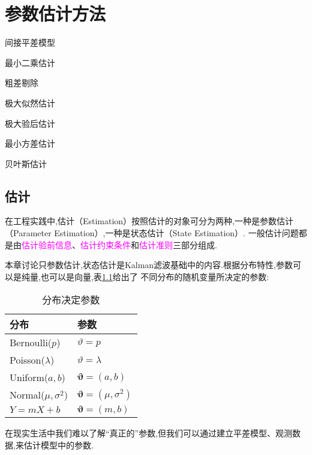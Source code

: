 \documentclass[cn,10pt,citestyle=gb7714-2015,bibstyle=gb7714-2015]{elegantbook}
\begin{document}
\chapter{参数估计方法}
\begin{introduction}
  \item 间接平差模型
  \item 最小二乘估计
  \item 粗差剔除
  \item 极大似然估计
  \item 极大验后估计
  \item 最小方差估计
  \item 贝叶斯估计
\end{introduction}
\section{估计}
在工程实践中,估计（Estimation）按照估计的对象可分为两种,一种是参数估计（Parameter Estimation）,一种是状态估计（State Estimation）.
一般估计问题都是由\textcolor{magenta}{估计验前信息}、\textcolor{magenta}{估计约束条件}和\textcolor{magenta}{估计准则}三部分组成.

本章讨论只参数估计,状态估计是Kalman滤波基础中的内容.根据分布特性,参数可以是纯量,也可以是向量,表\ref{tab:parameter}给出了
不同分布的随机变量所决定的参数:
\begin{table}[H]
  \begin{center}
    \caption{分布决定参数}
    \label{tab:parameter}
    \begin{tabular}{ll}
      \toprule
      \textbf{分布}&\textbf{参数}\\ \hline
      Bernoulli($p$)&$\vartheta=p$\\ \hline
      Poisson($\lambda$)&$\vartheta=\lambda$\\ \hline
      Uniform($a,b$)&$\bm{\vartheta}=(a,b)$\\ \hline
      Normal($\mu,\sigma^2$)&$\bm{\vartheta}=(\mu,\sigma^2)$\\ \hline
      $Y=mX+b$&$\bm{\vartheta}=(m,b)$\\ \bottomrule
    \end{tabular}
  \end{center}
\end{table}
在现实生活中我们难以了解“真正的”参数,但我们可以通过建立平差模型、观测数据,来估计模型中的参数.
\end{document}
